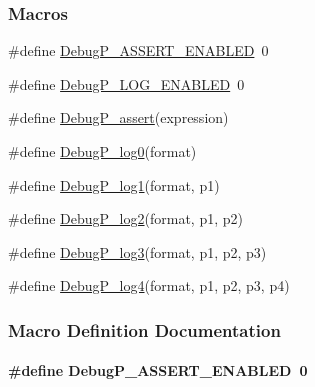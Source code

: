\subsubsection*{Macros}
\begin{DoxyCompactItemize}
\item 
\#define \hyperlink{_debug_p_8h_a03b7dc7186ecc72ee015f386b1c16260}{Debug\+P\+\_\+\+A\+S\+S\+E\+R\+T\+\_\+\+E\+N\+A\+B\+L\+E\+D}~0
\item 
\#define \hyperlink{_debug_p_8h_ad65fb9a156b26af7d75f81db3cfc49c3}{Debug\+P\+\_\+\+L\+O\+G\+\_\+\+E\+N\+A\+B\+L\+E\+D}~0
\item 
\#define \hyperlink{_debug_p_8h_a552e9055ca7eab5fe6c224c6cd5a9d4c}{Debug\+P\+\_\+assert}(expression)
\item 
\#define \hyperlink{_debug_p_8h_ac1ccfa728e7a1093f755156d5b7dbe7f}{Debug\+P\+\_\+log0}(format)
\item 
\#define \hyperlink{_debug_p_8h_a441ad40dc1a0da66e14d6eb24fe1bfe3}{Debug\+P\+\_\+log1}(format,  p1)
\item 
\#define \hyperlink{_debug_p_8h_aadc8ab941bd1bf3014ba19091d709c54}{Debug\+P\+\_\+log2}(format,  p1,  p2)
\item 
\#define \hyperlink{_debug_p_8h_acf9fd9f696becf00db78ab1248836d43}{Debug\+P\+\_\+log3}(format,  p1,  p2,  p3)
\item 
\#define \hyperlink{_debug_p_8h_a26a49fb45fed248e5fcbf19351d51fef}{Debug\+P\+\_\+log4}(format,  p1,  p2,  p3,  p4)
\end{DoxyCompactItemize}


\subsubsection{Macro Definition Documentation}
\paragraph[{Debug\+P\+\_\+\+A\+S\+S\+E\+R\+T\+\_\+\+E\+N\+A\+B\+L\+E\+D}]{\setlength{\rightskip}{0pt plus 5cm}\#define Debug\+P\+\_\+\+A\+S\+S\+E\+R\+T\+\_\+\+E\+N\+A\+B\+L\+E\+D~0}\label{_debug_p_8h_a03b7dc7186ecc72ee015f386b1c16260}
